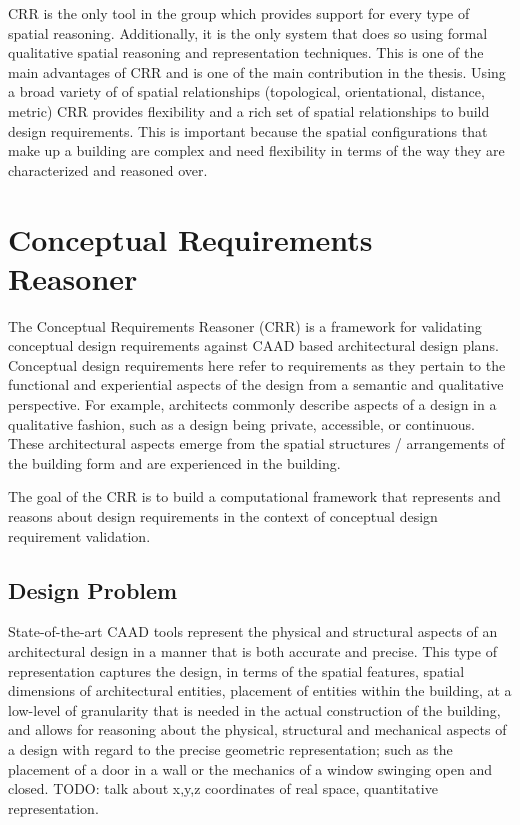 \documentclass[12pt]{ucthesis}
\begin{document}
CRR is the only tool in the group which provides support for every type of spatial reasoning. Additionally, it is the only system that does so using formal qualitative spatial reasoning and representation techniques. This is one of the main advantages of CRR and is one of the main contribution in the thesis. Using a broad variety of of spatial relationships (topological, orientational, distance, metric) CRR provides flexibility and a rich set of spatial relationships to build design requirements. This is important because the spatial configurations that make up a building are complex and need flexibility in terms of the way they are characterized and reasoned over. 


\chapter{Conceptual Requirements Reasoner}
The Conceptual Requirements Reasoner (CRR) is a framework for validating conceptual design requirements against CAAD based architectural design plans. Conceptual design requirements here refer to requirements as they pertain to the functional and experiential aspects of the design from a semantic and qualitative perspective. For example, architects commonly describe aspects of a design in a qualitative fashion, such as a design being private, accessible, or continuous. These architectural aspects emerge from the spatial structures / arrangements of the building form and are experienced in the building. 

The goal of the CRR is to build a computational framework that represents and reasons about design requirements in the context of conceptual design requirement validation.     

\section{Design Problem}
State-of-the-art CAAD tools represent the physical and structural aspects of an architectural design in a manner that is both accurate and precise. This type of representation captures the design, in terms of the spatial features, spatial dimensions of architectural entities, placement of entities within the building, at a low-level of granularity that is needed in the actual construction of the building, and allows for reasoning about the physical, structural and mechanical aspects of a design with regard to the precise geometric representation; such as the placement of a door in a wall or the mechanics of a window swinging open and closed. TODO: talk about x,y,z coordinates of real space, quantitative representation.
\end{document}
